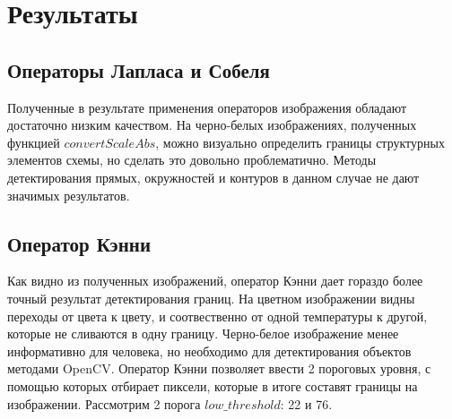 \section{Результаты}




\subsection{Операторы Лапласа и Собеля}




Полученные в результате применения операторов изображения обладают достаточно низким качеством. На черно-белых изображениях, полученных функцией $convertScaleAbs$, можно визуально определить границы структурных элементов схемы, но сделать это довольно проблематично. Методы детектирования прямых, окружностей и контуров в данном случае не дают значимых результатов.


\subsection{Оператор Кэнни}



Как видно из полученных изображений, оператор Кэнни дает гораздо более точный результат детектирования границ. На цветном изображении видны переходы от цвета к цвету, и соотвественно от одной температуры к другой, которые не сливаются в одну границу. Черно-белое изображение менее информативно для человека, но необходимо для детектирования объектов методами OpenCV. 
\newline 
Оператор Кэнни позволяет ввести 2 пороговых уровня, с помощью которых отбирает пиксели, которые в итоге составят границы на изображении. Рассмотрим 2 порога $low\_threshold$: 22 и 76.

